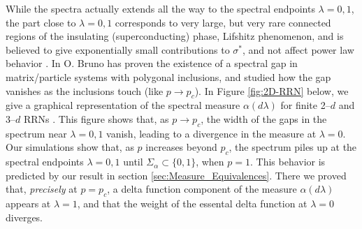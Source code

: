 \documentclass[jmp,graphicx]{revtex4-1}
\begin{document}
While the spectra actually extends all the way
to the spectral endpoints $\lambda=0,1$, the part close to $\lambda=0,1$
corresponds to very large, but very rare connected regions of the
insulating (superconducting) phase, Lifshitz phenomenon, and is
believed to give exponentially small contributions to $\sigma^*$, and not
affect power law behavior \cite{Golden:PRL-3935}. In
\cite{Bruno:PRSLA-353} O. Bruno has proven the existence of a spectral
gap in matrix/particle systems with polygonal inclusions, and studied
how the gap vanishes as the inclusions touch (like $p\to p_c$). In
Figure \ref{fig:2D-RRN} below, we give a graphical representation of the
spectral measure $\alpha(d\lambda)$ for finite 2--$d$ and 3--$d$ RRNs
\cite{Golden:JoB:337}. This figure shows that, as $p\to p_c$, the width
of the gaps in the spectrum near $\lambda=0,1$ vanish, leading to a
divergence in the measure at $\lambda=0$. Our simulations show that, as $p$
increases beyond $p_c$, the spectrum piles up at the spectral
endpoints $\lambda=0,1$ until $\Sigma_\alpha\subset\{0,1\}$, when $p=1$. This behavior is
predicted by our result in section
\ref{sec:Measure_Equivalences}. There we proved that, \emph{precisely}
at $p=p_c$, a delta function component of the measure $\alpha(d\lambda)$ appears 
at $\lambda=1$, and that the weight of the essental delta function at $\lambda=0$
diverges.
\end{document}
